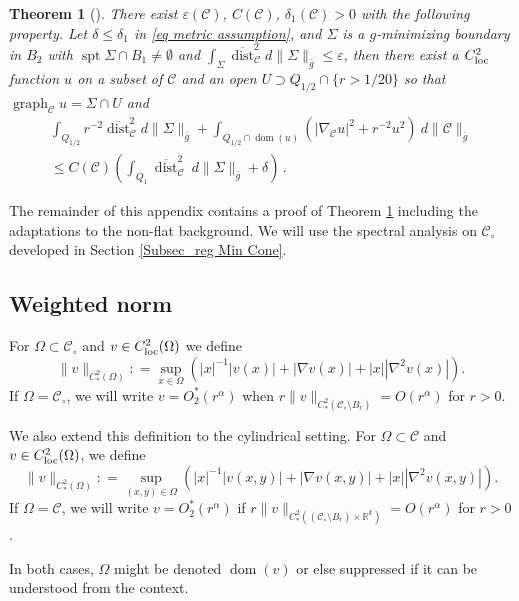 \documentclass[11pt, letterpaper, reqno]{amsart}
\numberwithin{equation}{section}
\newtheorem{Thm}[Def]{Theorem}
\theoremstyle{remark}
\newcommand{\RR}{\mathbb{R}}
\newcommand{\cC}{\mathcal{C}}
\newcommand{\supp}{\operatorname{spt}}
\newcommand{\graph}{\operatorname{graph}}
\newcommand{\dist}{\operatorname{dist}}
\newcommand{\Sdist}{\overline{\dist}}
\DeclareMathOperator{\Dom}{dom}
\newcommand{\eps}{\varepsilon}
\begin{document}
    
  
  \begin{Thm}[{\cite[Theorem 2.1]{Simon:uniqueness.some}}] \label{Thm_Simon's L^2 Noncon}
    There exist $\eps(\cC)$, $C(\cC)$, $\delta_1(\cC) > 0$ with the following property. Let $\delta \leq \delta_1$ in \eqref{eq metric assumption}, and $\Sigma$ is a $g$-minimizing boundary in $B_2$ with $\supp \Sigma \cap B_1 \neq \emptyset$ and  $\int_{\Sigma} \Sdist_\cC^2 d\|\Sigma\|_{\bar g} \leq \eps$, then there exist a $C^2_{\textnormal{loc}}$ function $u$ on a subset of $\cC$ and an open $U\supset Q_{1/2}\cap \{r>1/20\}$ so that $\graph_\cC u = \Sigma \cap U$ and 
    \begin{multline*}
      \int_{Q_{1/2}} r^{-2}\Sdist_\cC^2 d\|\Sigma\|_{\bar g} + \int_{Q_{1/2} \cap \Dom(u)} (|\nabla_\cC u|^2 + r^{-2}u^2)\ d\|\cC\|_{\bar g} \\
      \leq C(\cC) \left( \int_{Q_1} \Sdist_\cC^2 \ d\|\Sigma\|_{\bar g} + \delta \right) \, . 
    \end{multline*}
  \end{Thm}
The remainder of this appendix contains a proof of Theorem \ref{Thm_Simon's L^2 Noncon} including the adaptations to the non-flat background. We will use the spectral analysis on $\cC_\circ$ developed in Section \ref{Subsec_reg Min Cone}. 

  
  \subsection{Weighted norm}\label{Subsec_weighted}
  
For $\Omega \subset \cC_\circ$ and $v \in C^2_\textnormal{loc}(\Omega)$ we define 
\[
\|v\|_{C^2_*(\Omega)} : = \sup_{x \in \Omega} \left( |x|^{-1}|v(x)| + |\nabla v(x)| + |x| |\nabla^2 v(x)| \right).
\]
If $\Omega = \cC_\circ$, we will write $v = O^*_2(r^\alpha)$ when  $r \|v\|_{C^2_*(\cC_\circ\setminus B_r)} = O(r^\alpha)$ for $r > 0$.

We also extend this definition to the cylindrical setting. For $\Omega \subset \cC$ and $v \in C^2_\textnormal{loc}(\Omega)$, we define
\[
\|v\|_{C^2_*(\Omega)} : = \sup_{(x,y) \in \Omega} \left( |x|^{-1}|v(x,y)| + |\nabla v(x,y)| + |x| |\nabla^2 v(x,y)| \right).
\]
If $\Omega = \cC$, we will write $v = O^*_2(r^\alpha)$ if $r \|v\|_{C^2_*((\cC_\circ\setminus B_r) \times \RR^k)} = O(r^\alpha)$ for $r > 0$. 

In both cases, $\Omega$ might be denoted $\Dom(v)$ or else suppressed if it can be understood from the context.
  
\end{document}
